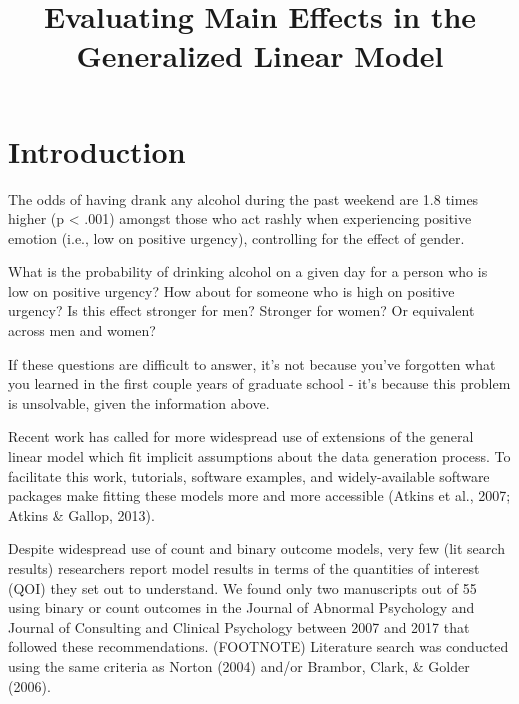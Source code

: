 \documentclass[jou, apacite]{apa6}
\begin{document}
\title{Evaluating Main Effects in the Generalized Linear Model}


\abstract{}



\maketitle

\section{Introduction}
The odds of having drank any alcohol during the past weekend are 1.8 times higher (p < .001) amongst those who act rashly when experiencing positive emotion (i.e., low on positive urgency), controlling for the effect of gender.

What is the probability of drinking alcohol on a given day for a person who is low on positive urgency? How about for someone who is high on positive urgency? Is this effect stronger for men? Stronger for women? Or equivalent across men and women?

If these questions are difficult to answer, it's not because you've forgotten what you learned in the first couple years of graduate school - it's because this problem is unsolvable, given the information above. 

Recent work has called for more widespread use of extensions of the general linear model which fit implicit assumptions about the data generation process. 
To facilitate this work, tutorials, software examples, and widely-available software packages make fitting these models more and more accessible (Atkins et al., 2007; Atkins \& Gallop, 2013).

Despite widespread use of count and binary outcome models, very few (lit search results) researchers report model results in terms of the quantities of interest (QOI) they set out to understand. 
We found only two manuscripts out of 55 using binary or count outcomes in the Journal of Abnormal Psychology and Journal of Consulting and Clinical Psychology between 2007 and 2017 that followed these recommendations. (FOOTNOTE) 
Literature search was conducted using the same criteria as Norton (2004) and/or Brambor, Clark, \& Golder (2006). 
\end{document}
